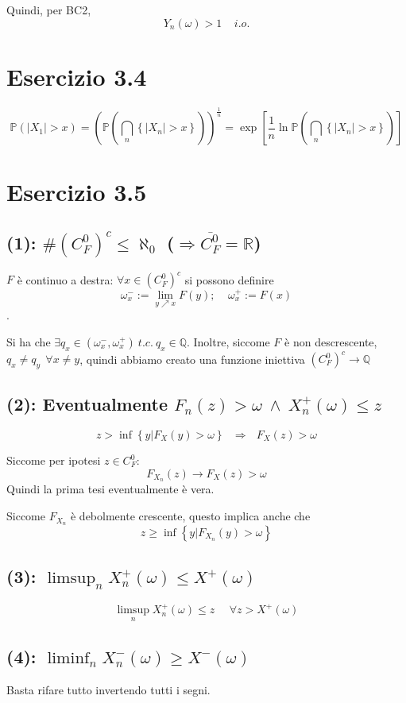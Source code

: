 \documentclass{article}
\begin{document}
Quindi, per BC2,
\[
	Y_n(\omega )>1\ \ \ \ \ i.o.
\]


\section{Esercizio 3.4}
\[
	\mathbb{P}\left(|X_1|>x\right) = \left(\mathbb{P}\left(\bigcap_{n} \left\{|X_n| > x\right\}\right)\right)^{\frac{1}{n}} = \exp \left[\frac{1}{n} \ln \mathbb{P}\left(\bigcap_n \left\{|X_n| > x\right\}\right)\right]
\]

\section{Esercizio 3.5}
\subsection{(1): $\#\left(C_F^0\right)^c \leq  \aleph_0$  ($\Rightarrow \overline{C_F^0} = \mathbb{R}$)}
$F$ è continuo a destra: $\forall x\in (C_F^0)^c$ si possono definire $$\omega_x^- := \lim_{y \nearrow x} F(y); \ \ \ \ \ \omega _x^+ := F(x)$$.

Si ha che $\exists q_x \in  (\omega _x^-, \omega _x^+) \ t.c.\ q_x\in \mathbb{Q}$. Inoltre, siccome $F$ è non descrescente, $q_x \neq  q_y\ \  \forall x\neq y$, quindi abbiamo creato una funzione iniettiva $(C_F^0)^c \longrightarrow \mathbb{Q}$

\subsection{(2): Eventualmente $F_n(z)>\omega \ \land \ X_n^+(\omega )\leq z$}
\[
	z > \inf\left\{y | F_X(y) > \omega \right\} \ \ \ \Longrightarrow \ \ \ F_X(z) > \omega 
\]

Siccome per ipotesi $z \in  C_F^0$:
\[
	F_{X_n} \left(z\right) \longrightarrow  F_X(z) > \omega 
\]
Quindi la prima tesi eventualmente è vera.

Siccome $F_{X_n}$ è debolmente crescente, questo implica anche che
\[
	z \geq  \inf\left\{y | F_{X_n}(y) > \omega \right\}
\]

\subsection{(3): $\limsup_n X_n^+(\omega ) \leq  X^+(\omega )$}
\[
	\limsup_n X_n^+(\omega ) \leq z\ \ \ \ \ \ \forall  z> X^+(\omega )
\]

\subsection{(4): $\liminf_n X_n^-(\omega ) \geq  X^-(\omega )$}
Basta rifare tutto invertendo tutti i segni.
\end{document}
